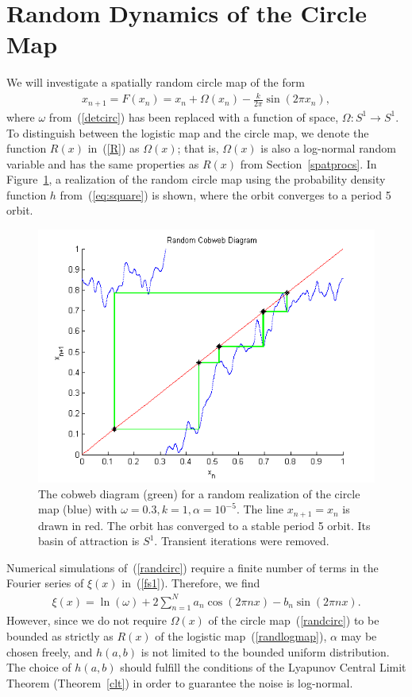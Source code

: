 \section{Random Dynamics of the Circle Map}
We will investigate a spatially random circle map of the form
\begin{align}\label{randcirc}
x_{n+1}= F(x_n) =  x_n + \Omega(x_n) - \frac{k}{2\pi}\sin(2\pi x_n),
\end{align}
where $\omega$ from~(\ref{detcirc}) has been replaced with a function
of space, $\Omega:S^1\to S^1$. To distinguish between the logistic map
and the circle map, we denote the function $R(x)$ in~(\ref{R}) as
$\Omega(x)$; that is, $\Omega(x)$ is also a log-normal random variable
and has the same properties as $R(x)$ from Section~\ref{spatprocs}. In Figure~\ref{fig:rcircstable}, a realization of the
random circle map using the probability density function $h$ from~(\ref{eq:square}) is shown,
where the orbit converges to a period 5 orbit. 
\begin{figure}[!h]
\caption[Random circle map, stable orbit]{The cobweb
  diagram (green) for a random realization of the circle map (blue) with $\omega =
  0.3, k=1, \alpha = 10^{-5}$. The line $x_{n+1}=x_n$ is drawn in red. The orbit
  has converged to a stable period 5 orbit. Its basin of attraction is
  $S^1$. Transient iterations were removed.}\label{fig:rcircstable}
	\begin{center}
		\includegraphics[scale=0.7]{figs/randcirc_cobweb.png}
	\end{center}
\end{figure}
Numerical simulations of~(\ref{randcirc}) require a finite number of
terms in the Fourier series of $\xi(x)$ in~(\ref{fs1}). Therefore, we find
\begin{align}\label{fs_circ}
\xi(x) = \ln(\omega) + 2\sum^N_{n=1}a_n\cos(2\pi nx)-b_n\sin(2\pi nx).
\end{align}
However, since we
do not require $\Omega(x)$ of the circle map~(\ref{randcirc}) to be bounded as strictly
as $R(x)$ of the logistic map~(\ref{randlogmap}), $\alpha$ may be
chosen freely, and $h(a,b)$ is not limited to the bounded uniform
distribution. The choice of $h(a,b)$ should fulfill the conditions of
the Lyapunov Central Limit Theorem (Theorem~\ref{clt}) in order to
guarantee the noise is log-normal.


